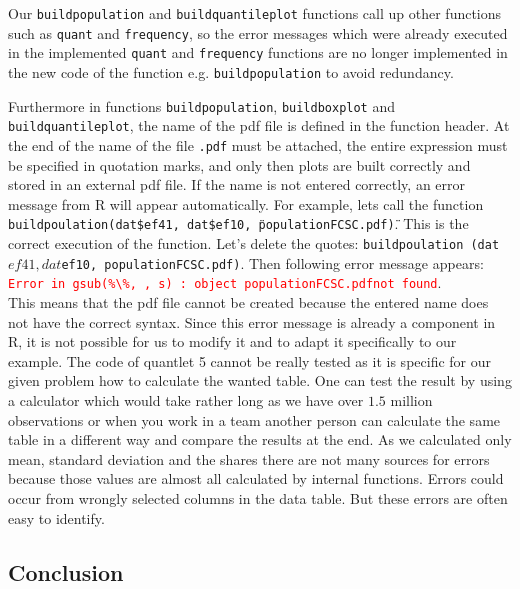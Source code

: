 Our \texttt{buildpopulation} and \texttt{buildquantileplot} functions call up other functions such as \texttt{quant} and \texttt{frequency}, so the error messages which were already executed in the implemented \texttt{quant} and \texttt{frequency} functions are no longer implemented in the new code of the function e.g. \texttt{buildpopulation} to avoid redundancy.

Furthermore in functions \texttt{buildpopulation}, \texttt{buildboxplot} and \texttt{buildquantileplot}, the name of the pdf file is defined in the function header. At the end of the name of the file \texttt{.pdf} must be attached, the entire expression must be specified in quotation marks, and only then plots are built correctly and stored in an external pdf file. If the name is not entered correctly, an error message from R will appear automatically. For example, lets call the function \texttt{buildpoulation(dat\$ef41, dat\$ef10, \"populationFCSC.pdf\")}. This is the correct execution of the function. Let's delete the quotes: \texttt{buildpoulation (dat$ef41, dat$ef10, populationFCSC.pdf)}. Then following error message appears:\\ \texttt{\textcolor{red}{Error in gsub(\dq \%\textbackslash \%\dq , \dq \dq , s) : object \dq populationFCSC.pdf\dq not found}}.\\This means that the pdf file cannot be created because the entered name does not have the correct syntax. Since this error message is already a component in R, it is not possible for us to modify it and to adapt it specifically to our example.
% 
The code of quantlet 5 cannot be really tested as it is specific for our given problem how to calculate the wanted table. One can test the result by using a calculator which would take rather long as we have over $1.5$ million observations or when you work in a team another person can calculate the same table in a different way and compare the results at the end. As we calculated only mean, standard deviation and the shares there are not many sources for errors because those values are almost all calculated by internal functions. Errors could occur from wrongly selected columns in the data table. But these errors are often easy to identify.


\subsection{Conclusion}

